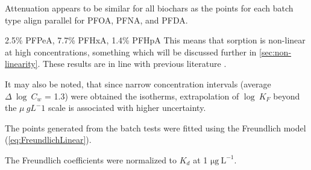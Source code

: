 
Attenuation appears to be similar for all biochars as the points for each batch type align parallel for PFOA, PFNA, and PFDA.

2.5\% PFPeA, 7.7\% PFHxA, 1.4\% PFHpA
This means that sorption is non-linear at high concentrations, something which will be discussed further in \cref{sec:non-linearity}. These results are in line with previous literature \citep{deng2010removal, zhou2010sorption}.

It may also be noted, that since narrow concentration intervals (average $\Delta~\log~C_w$ = 1.3) were obtained the isotherms, extrapolation of $\log~K_F$ beyond the $\mu~g L^-1$ scale is associated with higher uncertainty. 
 
The points generated from the batch tests were fitted using the Freundlich model (\cref{eq:FreundlichLinear}).

The Freundlich coefficients were normalized to $K_d$ at 1 $\mathrm{\mu g~L^{-1}}$.
